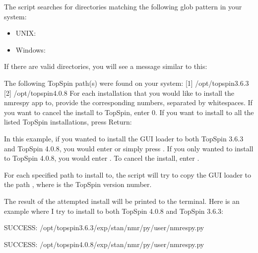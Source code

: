 \documentclass[letterpaper,10pt,english]{sphinxmanual}
\begin{document}
\sphinxAtStartPar
The script searches for directories matching the following glob pattern in your
system:
\begin{itemize}
\item {} 
\sphinxAtStartPar
UNIX: 

\item {} 
\sphinxAtStartPar
Windows: 

\end{itemize}

\sphinxAtStartPar
If there are valid directories, you will see a message similar to this:

\begin{sphinxVerbatim}[commandchars=\\\{\}]
The following TopSpin path(s) were found on your system:
    [1] /opt/topspin3.6.3
    [2] /opt/topspin4.0.8
For each installation that you would like to install the nmrespy app to,
provide the corresponding numbers, separated by whitespaces.
If you want to cancel the install to TopSpin, enter 0.
If you want to install to all the listed TopSpin installations, press \PYGZlt{}Return\PYGZgt{}:
\end{sphinxVerbatim}

\sphinxAtStartPar
In this example, if you wanted to install the GUI loader to both TopSpin 3.6.3
and TopSpin 4.0.8, you would enter  or simply press . If you
only wanted to install to TopSpin 4.0.8, you would enter . To cancel the
install, enter .

\sphinxAtStartPar
For each specified path to install to, the script will try to copy the GUI
loader to the path ,
where  is the TopSpin version number.

\sphinxAtStartPar
The result of the attempted install will be printed to the terminal. Here is
an example where I try to install to both TopSpin 4.0.8 and TopSpin 3.6.3:

\begin{sphinxVerbatim}[commandchars=\\\{\}]
SUCCESS:
    /opt/topspin3.6.3/exp/stan/nmr/py/user/nmrespy.py

SUCCESS:
    /opt/topspin4.0.8/exp/stan/nmr/py/user/nmrespy.py
\end{sphinxVerbatim}
\end{document}
